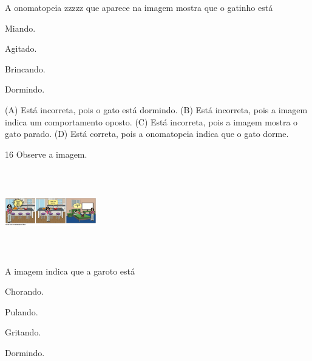 A onomatopeia zzzzz que aparece na imagem mostra que o gatinho está

\begin{minipage}{.5\textwidth}
\begin{escolha}
\item Miando.

\item Agitado.

\item Brincando.

\item Dormindo.
\end{escolha}
\end{minipage}

(A) Está incorreta, pois o gato está dormindo.
(B) Está incorreta, pois a imagem indica um comportamento oposto.
(C) Está incorreta, pois a imagem mostra o gato parado.
(D) Está correta, pois a onomatopeia indica que o gato dorme.

\num{16} Observe a imagem.

\includegraphics[width=1.57333in,height=1.45456in]{media/image162.png}


A imagem indica que a garoto está

\begin{minipage}{.5\textwidth}
\begin{escolha}
\item Chorando.

\item Pulando.

\item Gritando.

\item Dormindo.
\end{escolha}
\end{minipage}

